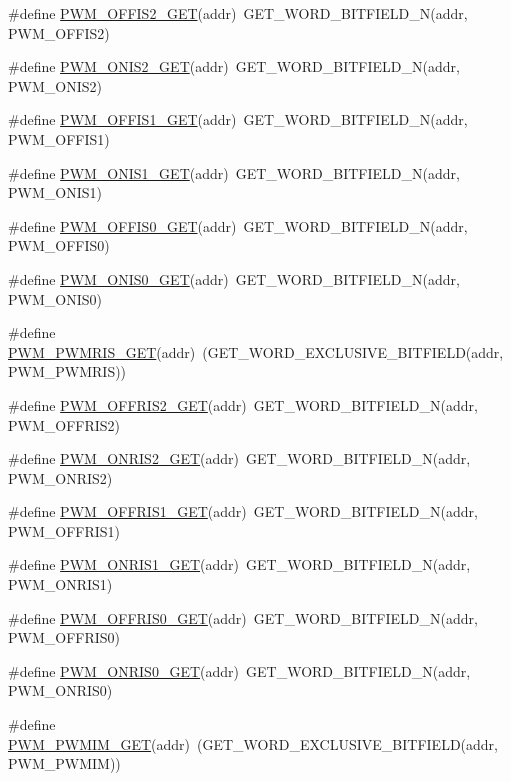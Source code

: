 \begin{DoxyCompactItemize}
\item 
\#define \hyperlink{a00564_a40c8025e9535e016b6fa6a8462672ac3}{PWM\_\-OFFIS2\_\-GET}(addr)~GET\_\-WORD\_\-BITFIELD\_\-N(addr, PWM\_\-OFFIS2)
\item 
\#define \hyperlink{a00564_ad9940b9e942341eff1768c15c0df6666}{PWM\_\-ONIS2\_\-GET}(addr)~GET\_\-WORD\_\-BITFIELD\_\-N(addr, PWM\_\-ONIS2)
\item 
\#define \hyperlink{a00564_af1b696108734f645d9091293466d626c}{PWM\_\-OFFIS1\_\-GET}(addr)~GET\_\-WORD\_\-BITFIELD\_\-N(addr, PWM\_\-OFFIS1)
\item 
\#define \hyperlink{a00564_ab781b7edd34ab5f46112c74b851ee1f0}{PWM\_\-ONIS1\_\-GET}(addr)~GET\_\-WORD\_\-BITFIELD\_\-N(addr, PWM\_\-ONIS1)
\item 
\#define \hyperlink{a00564_abc061c469d0837671b228ff13e6949ed}{PWM\_\-OFFIS0\_\-GET}(addr)~GET\_\-WORD\_\-BITFIELD\_\-N(addr, PWM\_\-OFFIS0)
\item 
\#define \hyperlink{a00564_a5716b2334368aa5866c105118073f985}{PWM\_\-ONIS0\_\-GET}(addr)~GET\_\-WORD\_\-BITFIELD\_\-N(addr, PWM\_\-ONIS0)
\item 
\#define \hyperlink{a00564_abb4de69cd44cdd3ccab023678d8ca4b2}{PWM\_\-PWMRIS\_\-GET}(addr)~(GET\_\-WORD\_\-EXCLUSIVE\_\-BITFIELD(addr, PWM\_\-PWMRIS))
\item 
\#define \hyperlink{a00564_a99beda9773b5c86a802715dff74fafa7}{PWM\_\-OFFRIS2\_\-GET}(addr)~GET\_\-WORD\_\-BITFIELD\_\-N(addr, PWM\_\-OFFRIS2)
\item 
\#define \hyperlink{a00564_a6c904fbd80a70de0c3868608fd826cba}{PWM\_\-ONRIS2\_\-GET}(addr)~GET\_\-WORD\_\-BITFIELD\_\-N(addr, PWM\_\-ONRIS2)
\item 
\#define \hyperlink{a00564_a08d834292aa0a713c2a441fe098808c1}{PWM\_\-OFFRIS1\_\-GET}(addr)~GET\_\-WORD\_\-BITFIELD\_\-N(addr, PWM\_\-OFFRIS1)
\item 
\#define \hyperlink{a00564_a8282d1e3240e6f881c10ea744180f50f}{PWM\_\-ONRIS1\_\-GET}(addr)~GET\_\-WORD\_\-BITFIELD\_\-N(addr, PWM\_\-ONRIS1)
\item 
\#define \hyperlink{a00564_a6d2b48e5e650b2ba1c43c4000fdbfbef}{PWM\_\-OFFRIS0\_\-GET}(addr)~GET\_\-WORD\_\-BITFIELD\_\-N(addr, PWM\_\-OFFRIS0)
\item 
\#define \hyperlink{a00564_a270e4d9efd9ce344e2fcfaa25b653824}{PWM\_\-ONRIS0\_\-GET}(addr)~GET\_\-WORD\_\-BITFIELD\_\-N(addr, PWM\_\-ONRIS0)
\item 
\#define \hyperlink{a00564_a32520bded8b3ea2fc4c5799e7c728912}{PWM\_\-PWMIM\_\-GET}(addr)~(GET\_\-WORD\_\-EXCLUSIVE\_\-BITFIELD(addr, PWM\_\-PWMIM))

\end{DoxyCompactItemize}

